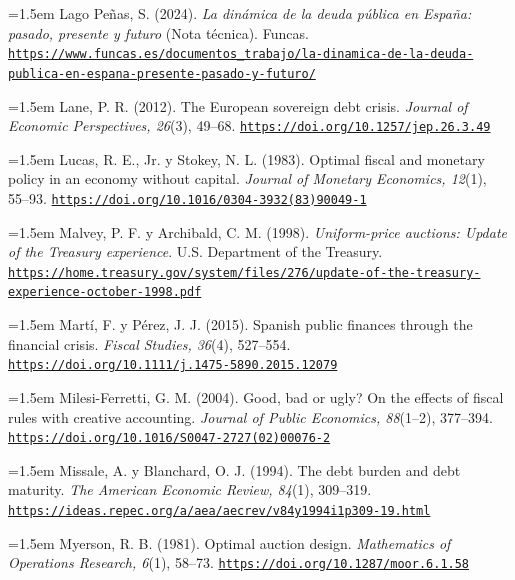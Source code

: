 \documentclass[10pt,a4paper]{article}
\begin{document}
\noindent\hangindent=1.5em Lago Peñas, S. (2024). \textit{La dinámica de la deuda pública en España: pasado, presente y futuro} (Nota técnica). Funcas. \href{https://www.funcas.es/documentos_trabajo/la-dinamica-de-la-deuda-publica-en-espana-presente-pasado-y-futuro/}{\nolinkurl{https://www.funcas.es/documentos_trabajo/la-dinamica-de-la-deuda-publica-en-espana-presente-pasado-y-futuro/}}

\noindent\hangindent=1.5em Lane, P. R. (2012). The European sovereign debt crisis. \textit{Journal of Economic Perspectives, 26}(3), 49--68. \href{https://doi.org/10.1257/jep.26.3.49}{\nolinkurl{https://doi.org/10.1257/jep.26.3.49}}

\noindent\hangindent=1.5em Lucas, R. E., Jr. y Stokey, N. L. (1983). Optimal fiscal and monetary policy in an economy without capital. \textit{Journal of Monetary Economics, 12}(1), 55--93. \href{https://doi.org/10.1016/0304-3932(83)90049-1}{\nolinkurl{https://doi.org/10.1016/0304-3932(83)90049-1}}

\noindent\hangindent=1.5em Malvey, P. F. y Archibald, C. M. (1998). \textit{Uniform-price auctions: Update of the Treasury experience}. U.S. Department of the Treasury. \href{https://home.treasury.gov/system/files/276/update-of-the-treasury-experience-october-1998.pdf}{\nolinkurl{https://home.treasury.gov/system/files/276/update-of-the-treasury-experience-october-1998.pdf}}

\noindent\hangindent=1.5em Martí, F. y Pérez, J. J. (2015). Spanish public finances through the financial crisis. \textit{Fiscal Studies, 36}(4), 527--554. \href{https://doi.org/10.1111/j.1475-5890.2015.12079}{\nolinkurl{https://doi.org/10.1111/j.1475-5890.2015.12079}}

\noindent\hangindent=1.5em Milesi-Ferretti, G. M. (2004). Good, bad or ugly? On the effects of fiscal rules with creative accounting. \textit{Journal of Public Economics, 88}(1--2), 377--394. \href{https://doi.org/10.1016/S0047-2727(02)00076-2}{\nolinkurl{https://doi.org/10.1016/S0047-2727(02)00076-2}}

\noindent\hangindent=1.5em Missale, A. y Blanchard, O. J. (1994). The debt burden and debt maturity. \textit{The American Economic Review, 84}(1), 309--319. \href{https://ideas.repec.org/a/aea/aecrev/v84y1994i1p309-19.html}{\nolinkurl{https://ideas.repec.org/a/aea/aecrev/v84y1994i1p309-19.html}}

\noindent\hangindent=1.5em Myerson, R. B. (1981). Optimal auction design. \textit{Mathematics of Operations Research, 6}(1), 58--73. \href{https://doi.org/10.1287/moor.6.1.58}{\nolinkurl{https://doi.org/10.1287/moor.6.1.58}}
\end{document}
